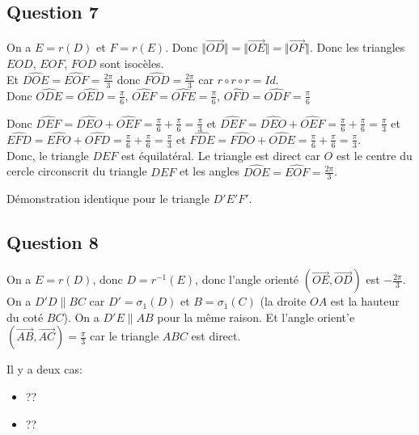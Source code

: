 \documentclass[]{book}
\theoremstyle{definition}
\begin{document}
\subsection*{Question 7}
On a $E = r(D)$ et $F = r(E)$. Donc $\Vert \overrightarrow{OD} \Vert = \Vert \overrightarrow{OE} \Vert = \Vert \overrightarrow{OF} \Vert$. Donc les triangles $EOD$, $EOF$, $FOD$ sont isoc\`eles.\\

Et $\widehat{DOE} = \widehat{EOF} = \frac{2\pi}{3}$ donc $\widehat{FOD} = \frac{2\pi}{3}$ car $r \circ r \circ r = Id$.\\

Donc $\widehat{ODE} = \widehat{OED} = \frac{\pi}{6}$, $\widehat{OEF} = \widehat{OFE} = \frac{\pi}{6}$, $\widehat{OFD} = \widehat{ODF} = \frac{\pi}{6}$ 

Donc $\widehat{DEF} = \widehat{DEO} + \widehat{OEF} = \frac{\pi}{6} + \frac{\pi}{6} = \frac{\pi}{3}$ et 
$\widehat{DEF} = \widehat{DEO} + \widehat{OEF} = \frac{\pi}{6} + \frac{\pi}{6} = \frac{\pi}{3}$ et 
$\widehat{EFD} = \widehat{EFO} + \widehat{OFD} = \frac{\pi}{6} + \frac{\pi}{6} = \frac{\pi}{3}$ et
$\widehat{FDE} = \widehat{FDO} + \widehat{ODE} = \frac{\pi}{6} + \frac{\pi}{6} = \frac{\pi}{3}$.\\

Donc, le triangle $DEF$ est \'equilat\'eral.
Le triangle est direct car $O$ est le centre du cercle circonscrit du triangle $DEF$ et les angles  $\widehat{DOE} = \widehat{EOF} = \frac{2\pi}{3}$.

D\'emonstration identique pour le triangle $D'E'F'$.\\


\subsection*{Question 8}
On a $E=r(D)$, donc $D = r^{-1}(E)$, donc l'angle orient\'e $(\overrightarrow{OE},\overrightarrow{OD})$ est $-\frac{2\pi}{3}$.\\

On a $D'D \parallel BC$ car $D'=\sigma_1(D)$ et $B=\sigma_1(C)$ (la droite $OA$ est la hauteur du cot\'e $BC$). On a $D'E \parallel AB$ pour la m\^eme raison. Et l'angle orient'e $(\overrightarrow{AB},\overrightarrow{AC}) = \frac{\pi}{3}$ car le triangle $ABC$ est direct.

Il y a deux cas:
\begin{itemize}
\item   ??
\item   ??
\end{itemize}
\end{document}
